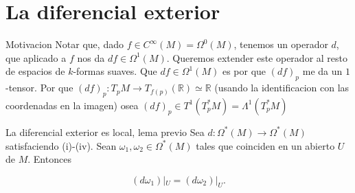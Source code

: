 \section{La diferencial exterior}
\begin{bookremark}{Motivacion}
Notar que, dado $f\in C^\infty(M)=\Omega^0(M)$, tenemos un operador $d$, que aplicado a $f$ nos da $df\in\Omega^1(M)$. Queremos extender este operador al resto de espacios de $k$-formas suaves. Que $df\in \Omega^{1}(M)$ es por que $(df)_{p}$ me da un $1$-tensor. Por que $(df)_{p}:T_{p}M\rightarrow T_{f(p)}(\mathbb{R})\simeq \mathbb{R}$ (usando la identificacion con las coordenadas en la imagen) osea $(df)_{p}\in T^{1}(T_{p}^{*}M)=\Lambda^{1}(T_{p}^{*}M)$

\end{bookremark}
\label{blk:171d2a}
\begin{booklemma}{La diferencial exterior es local, lema previo}
Sea $d:\Omega^*(M)\to\Omega^*(M)$ satisfaciendo (i)-(iv). Sean $\omega_1,\omega_2\in\Omega^*(M)$ tales que coinciden en un abierto $U$ de $M$. Entonces

\[
(d\omega_1)|_U=(d\omega_2)|_U.
\]
\end{booklemma}
